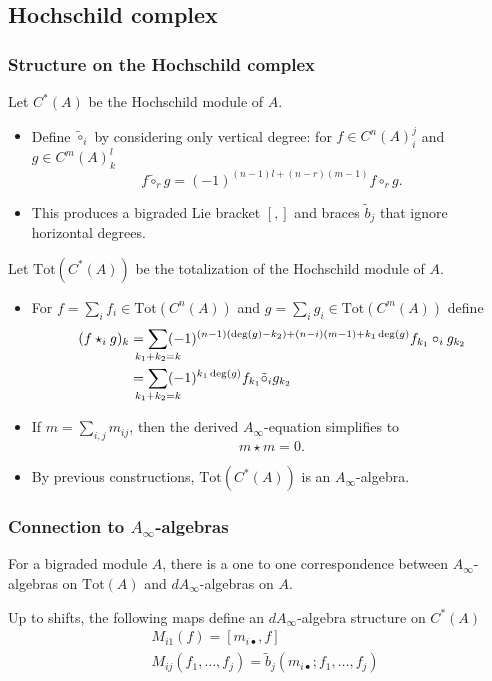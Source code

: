 \documentclass{beamer}
\theoremstyle{definition}
\newcommand{\Tot}{\mathrm{Tot}}
\begin{document}
\subsection{Hochschild complex}

\begin{frame}
\frametitle{Structure on the Hochschild complex}
Let $C^*(A)$ be the Hochschild module of $A$.
\begin{itemize}
\item<1-> Define $\tilde{\circ}_i$ by considering only vertical degree: for $f\in C^n(A)^j_i$ and $g\in C^m(A)^l_k$
\[f\tilde{\circ}_rg=(-1)^{(n-1)l+(n-r)(m-1)}f\circ_r g.\]
\item<2-> This produces a bigraded Lie bracket $[,]$ and braces $\tilde{b}_j$ that ignore horizontal degrees.

\end{itemize}
\end{frame}
\begin{frame}

Let $\Tot(C^*(A))$ be the totalization of the Hochschild module of $A$.
\begin{itemize}
\item<1-> For $f=\sum_i f_i\in \Tot(C^n(A))$ and $g=\sum_i g_i\in \Tot(C^m(A))$ define %
\begin{align*}
(f\star_ig)_k&=\sum_{\mathclap{k_1+k_2=k}} (-1)^{(n-1)(\deg(g)-k_2)+(n-i)(m-1)+k_1\deg(g)}f_{k_1}\circ_i g_{k_2}\\
             &= \sum_{\mathclap{k_1+k_2=k}} (-1)^{k_1\deg(g)}f_{k_1}\tilde{\circ}_i g_{k_2}
\end{align*}

\item<2-> If $m=\sum_{i,j} m_{ij}$, then the derived $A_\infty$-equation simplifies to 
\[m\star m = 0.\]
\item<3-> By previous constructions, $\Tot(C^*(A))$ is an $A_\infty$-algebra.
\end{itemize}
\end{frame}


\begin{frame}
\frametitle{Connection to $A_\infty$-algebras}
\begin{theorem}
For a bigraded module $A$, there is a one to one correspondence between $A_\infty$-algebras on $\Tot(A)$ and $dA_\infty$-algebras on $A$.
\end{theorem}\pause
\begin{corollary}
Up to shifts, the following maps define an $dA_\infty$-algebra structure on $C^*(A)$
\begin{align*}
&M_{i1}(f)=[m_{i\bullet},f]\\
&M_{ij}(f_1,\dots, f_j)=\tilde{b}_j(m_{i\bullet};f_1,\dots, f_j)
\end{align*}
\end{corollary}

\end{frame}
\end{document}
